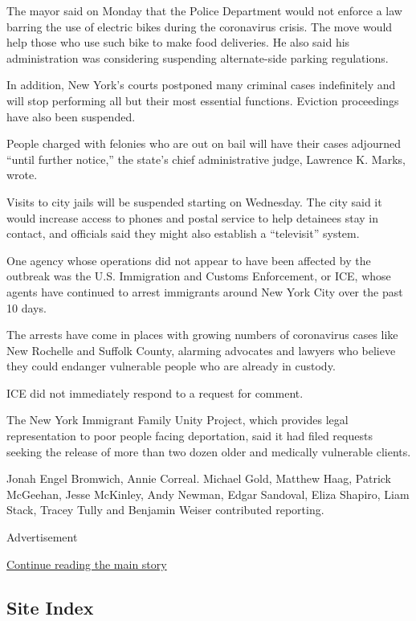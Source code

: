 The mayor said on Monday that the Police Department would not enforce a
law barring the use of electric bikes during the coronavirus crisis. The
move would help those who use such bike to make food deliveries. He also
said his administration was considering suspending alternate-side
parking regulations.

In addition, New York's courts postponed many criminal cases
indefinitely and will stop performing all but their most essential
functions. Eviction proceedings have also been suspended.

People charged with felonies who are out on bail will have their cases
adjourned ``until further notice,'' the state's chief administrative
judge, Lawrence K. Marks, wrote.

Visits to city jails will be suspended starting on Wednesday. The city
said it would increase access to phones and postal service to help
detainees stay in contact, and officials said they might also establish
a ``televisit'' system.

One agency whose operations did not appear to have been affected by the
outbreak was the U.S. Immigration and Customs Enforcement, or ICE, whose
agents have continued to arrest immigrants around New York City over the
past 10 days.

The arrests have come in places with growing numbers of coronavirus
cases like New Rochelle and Suffolk County, alarming advocates and
lawyers who believe they could endanger vulnerable people who are
already in custody.

ICE did not immediately respond to a request for comment.

The New York Immigrant Family Unity Project, which provides legal
representation to poor people facing deportation, said it had filed
requests seeking the release of more than two dozen older and medically
vulnerable clients.

Jonah Engel Bromwich, Annie Correal. Michael Gold, Matthew Haag, Patrick
McGeehan, Jesse McKinley, Andy Newman, Edgar Sandoval, Eliza Shapiro,
Liam Stack, Tracey Tully and Benjamin Weiser contributed reporting.

Advertisement

\protect\hyperlink{after-bottom}{Continue reading the main story}

\hypertarget{site-index}{%
\subsection{Site Index}\label{site-index}}

